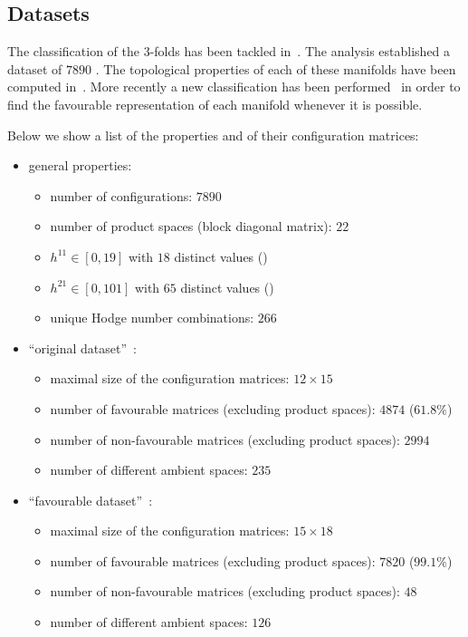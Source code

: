 \subsection{Datasets}
\label{sec:data:datasets}

The classification of the \cicy $3$-folds has been tackled in~\cite{Candelas:1988:CompleteIntersectionCalabiYau}.
The analysis established a dataset of $7890$ \cicy.
The topological properties of each of these manifolds have been computed in~\cite{Green:1989:AllHodgeNumbers}.
More recently a new classification has been performed~\cite{Anderson:2017:FibrationsCICYThreefolds} in order to find the favourable representation of each manifold whenever it is possible.

Below we show a list of the \cicy properties and of their configuration matrices:
\begin{itemize}
  \item general properties:
  \begin{itemize}
    \item number of configurations: $7890$
    \item number of product spaces (block diagonal matrix): $22$
    \item $h^{11} \in [0, 19]$ with $18$ distinct values ()
    \item $h^{21} \in [0, 101]$ with $65$ distinct values ()
    \item unique Hodge number combinations: $266$
  \end{itemize}

  \item ``original dataset''~\cite{Candelas:1988:CompleteIntersectionCalabiYau, Green:1989:AllHodgeNumbers}:
  \begin{itemize}
    \item maximal size of the configuration matrices: $12 \times 15$
    \item number of favourable matrices (excluding product spaces): $4874$ ($\num{61.8}\%$)
    \item number of non-favourable matrices (excluding product spaces): $2994$
    \item number of different ambient spaces: $235$
  \end{itemize}

  \item ``favourable dataset''~\cite{Anderson:2017:FibrationsCICYThreefolds}:
  \begin{itemize}
    \item maximal size of the configuration matrices: $15 \times 18$
    \item number of favourable matrices (excluding product spaces): $7820$ ($\num{99.1}\%$)
    \item number of non-favourable matrices (excluding product spaces): $48$
    \item number of different ambient spaces: $126$
  \end{itemize}
\end{itemize}

